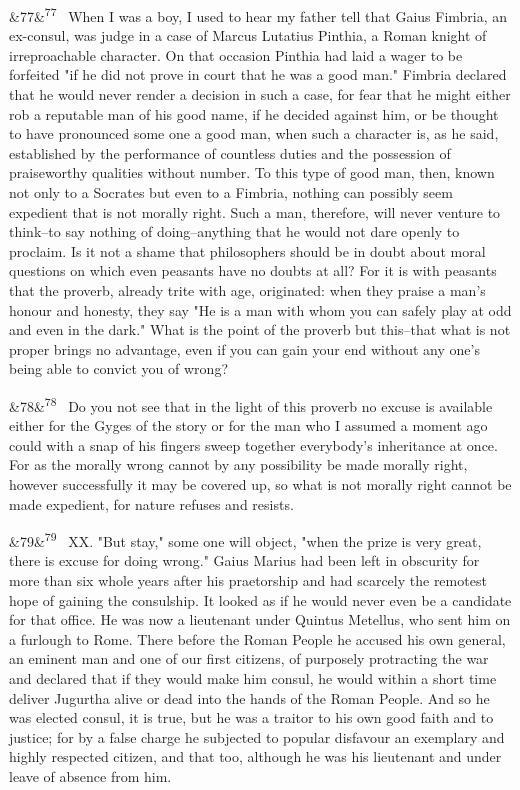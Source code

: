\documentclass[12pt]{article}
\newcommand{\para}[1][]{\par\noindent\ifx&#1&\else\textsuperscript{\footnotesize #1}~\fi}
\begin{document}
\para[77] When I was a boy, I used to hear my father tell that Gaius Fimbria, an ex-consul, was judge in a case of Marcus Lutatius Pinthia, a Roman knight of irreproachable character. On that occasion Pinthia had laid a wager to be forfeited "if he did not prove in court that he was a good man." Fimbria declared that he would never render a decision in such a case, for fear that he might either rob a reputable man of his good name, if he decided against him, or be thought to have pronounced some one a good man, when such a character is, as he said, established by the performance of countless duties and the possession of praiseworthy qualities without number. To this type of good man, then, known not only to a Socrates but even to a Fimbria, nothing can possibly seem expedient that is not morally right. Such a man, therefore, will never venture to think--to say nothing of doing--anything that he would not dare openly to proclaim. Is it not a shame that philosophers should be in doubt about moral questions on which even peasants have no doubts at all? For it is with peasants that the proverb, already trite with age, originated: when they praise a man's honour and honesty, they say "He is a man with whom you can safely play at odd and even in the dark." What is the point of the proverb but this--that what is not proper brings no advantage, even if you can gain your end without any one's being able to convict you of wrong?

\para[78] Do you not see that in the light of this proverb no excuse is available either for the Gyges of the story or for the man who I assumed a moment ago could with a snap of his fingers sweep together everybody's inheritance at once. For as the morally wrong cannot by any possibility be made morally right, however successfully it may be covered up, so what is not morally right cannot be made expedient, for nature refuses and resists.

\para[79] XX. "But stay," some one will object, "when the prize is very great, there is excuse for doing wrong." Gaius Marius had been left in obscurity for more than six whole years after his praetorship and had scarcely the remotest hope of gaining the consulship. It looked as if he would never even be a candidate for that office. He was now a lieutenant under Quintus Metellus, who sent him on a furlough to Rome. There before the Roman People he accused his own general, an eminent man and one of our first citizens, of purposely protracting the war and declared that if they would make him consul, he would within a short time deliver Jugurtha alive or dead into the hands of the Roman People. And so he was elected consul, it is true, but he was a traitor to his own good faith and to justice; for by a false charge he subjected to popular disfavour an exemplary and highly respected citizen, and that too, although he was his lieutenant and under leave of absence from him.
\end{document}
